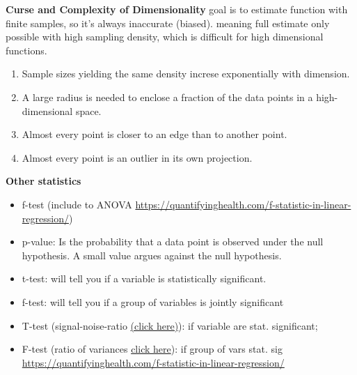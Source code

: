 {\textbf{Curse and Complexity of Dimensionality}
goal is to estimate function with finite samples, so it's always inaccurate (biased). 
meaning full estimate only possible with high sampling density, which is difficult for high dimensional functions.
\begin{enumerate}
	\item Sample sizes yielding the same density increse exponentially with dimension.
	\item A large radius is needed to enclose a fraction of the data points in a high-dimensional space.
	\item Almost every point is closer to an edge than to another point.
	\item Almost every point  is an outlier in its own projection.
\end{enumerate}
\textbf{Other statistics}
\begin{itemize}
    \item f-test (include to ANOVA \url{https://quantifyinghealth.com/f-statistic-in-linear-regression/})
    \item p-value: Is the probability that a data point is observed under the null hypothesis. A small value argues against the null hypothesis. 
    \item t-test: will tell you if a variable is statistically significant. 
    \item f-test: will tell you if a group of variables is jointly significant
    \item T-test (signal-noise-ratio \href{https://statisticsbyjim.com/hypothesis-testing/t-tests-1-sample-2-sample-paired-t-tests/}{(click here)}): if variable are stat. significant; 
    \item F-test (ratio of variances \href{https://statisticsbyjim.com/anova/f-tests-anova/}{click here}): if group of vars stat. sig \url{https://quantifyinghealth.com/f-statistic-in-linear-regression/}
\end{itemize}

}
